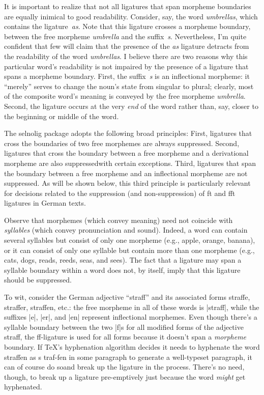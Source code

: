 \documentclass[11pt]{article}
\newcommand{\pkg}[1]{\textsf{#1}}
\begin{document}
It is important to realize that not all ligatures that span morpheme boundaries are equally inimical to good readability. Consider, say, the word \emph{umbrellas}, which contains the ligature~\emph{as}. Note that this ligature crosses a morpheme boundary, between the free morpheme \emph{umbrella} and the suffix~\emph{s}. Nevertheless, I'm quite confident that few will claim that the presence of the \emph{as} ligature detracts from the readability of the word \emph{umbrellas}. I believe there are two reasons why this particular word's readability is not impaired by the presence of a ligature that spans a morpheme boundary. First, the suffix~\emph{s} is an inflectional morpheme: it \enquote{merely} serves to change the noun's state from singular to plural; clearly, most of the composite word's meaning is conveyed by the free morpheme \emph{umbrella}. Second, the ligature occurs at the very \emph{end} of the word rather than, say, closer to the beginning or middle of the word.

The \pkg{selnolig} package adopts the following broad principles: First, ligatures that cross the boundaries of two free morphemes are always suppressed. Second, ligatures that cross the boundary between a free morpheme and a derivational morpheme are also suppressed\textemdash with certain exceptions. Third, ligatures that span the boundary between a free morpheme and an inflectional morpheme are not suppressed. As will be shown below, this third principle is particularly relevant for decisions related to the suppression (and non-suppression) of ft and fft ligatures in German texts.

Observe that morphemes (which convey meaning) need not coincide with \emph{syllables} (which convey pronunciation and sound). Indeed, a word can contain several syllables but consist of only one morpheme (e.g., apple, orange, banana), or it can consist of only one syllable but contain more than one morpheme (e.g., cats, dogs, reads, reeds, seas, and sees). The fact that a ligature may span a syllable boundary within a word does not, by itself, imply that this ligature should be suppressed. 

To wit, consider the German adjective \enquote{straff} and its associated forms straffe, straffer, straffen, etc.: the free morpheme in all of these words is |straff|, while the suffixes |e|, |er|, and |en| represent inflectional morphemes. Even though there's a syllable boundary between the two |f|s for all modified forms of the adjective straff, the ff-ligature is used for all forms because it doesn't span a \emph{morpheme} boundary. If TeX's hyphenation algorithm decides it needs to hyphenate the word straffen as s\kern0pt traf-fen in some paragraph to generate a well-typeset paragraph, it can of course do so\textemdash and break up the ligature in the process. There's no need, though, to break up a ligature pre-emptively just because the word \emph{might} get hyphenated.
\end{document}
